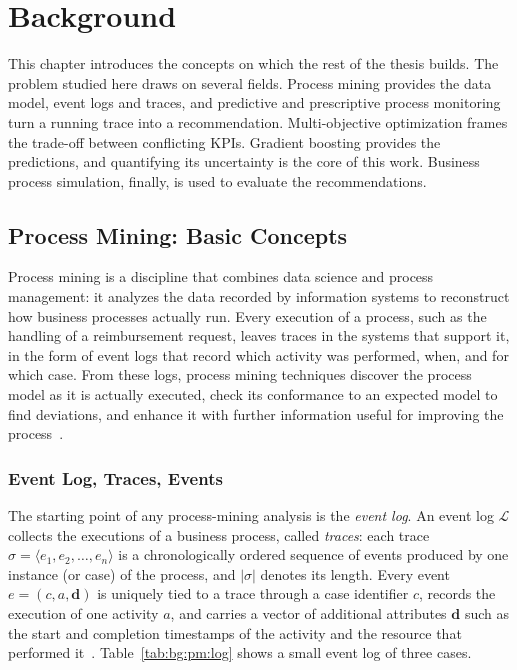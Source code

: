 \chapter{Background}
\label{chap:background}
This chapter introduces the concepts on which the rest of the thesis builds.
The problem studied here draws on several fields. Process mining provides the
data model, event logs and traces, and predictive and prescriptive process
monitoring turn a running trace into a recommendation. Multi-objective
optimization frames the trade-off between conflicting KPIs. Gradient boosting
provides the predictions, and quantifying its uncertainty is the core of this
work. Business process simulation, finally, is used to evaluate the
recommendations.

\section{Process Mining: Basic Concepts}
\label{sec:bg:pm}
Process mining is a discipline that combines data science and process
management: it analyzes the data recorded by information systems to
reconstruct how business processes actually run. Every execution of a
process, such as the handling of a reimbursement request, leaves traces in
the systems that support it, in the form of event logs that record which
activity was performed, when, and for which case. From these logs, process
mining techniques discover the process model as it is actually executed,
check its conformance to an expected model to find deviations, and enhance
it with further information useful for improving the
process~\cite{vanderaalst2016}.

\subsection{Event Log, Traces, Events}
    \label{subsec:bg:pm:log}
    The starting point of any process-mining analysis is the \emph{event log}. An
    event log $\mathcal{L}$ collects the executions of a business process, called
    \emph{traces}: each trace $\sigma = \langle e_1, e_2, \dots, e_n \rangle$ is a
    chronologically ordered sequence of events produced by one instance (or case)
    of the process, and $|\sigma|$ denotes its length. Every event
    $e = (c, a, \mathbf{d})$ is uniquely tied to a trace through a case identifier
    $c$, records the execution of one activity $a$, and carries a vector of
    additional attributes $\mathbf{d}$ such as the start
    and completion timestamps of the activity and the resource that performed
    it~\cite{le2025balancing}. Table~\ref{tab:bg:pm:log} shows a small event
    log of three cases.

